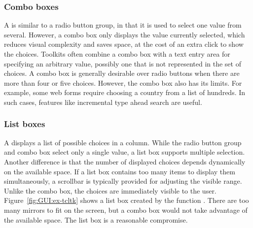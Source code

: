 \subsubsection{Combo boxes}
\label{sec:GUI:combo-boxes}

A  is similar to a radio button group, in that it is
used to select one value from several. However, a combo box only
displays the value currently selected, which reduces visual complexity
and saves space, at the cost of an extra click to show the
choices. Toolkits often combine a combo box with a text entry area for
specifying an arbitrary value, possibly one that is not represented in
the set of choices. A combo box is generally desirable over radio
buttons when there are more than four or five choices. However, the
combo box also has its limits. For example, some web forms require
choosing a country from a list of hundreds. In such cases, features
like incremental type ahead search are useful.

\subsubsection{List boxes}

A  displays a list of possible choices in a column.
While the radio button group and combo box select only a single value,
a list box supports multiple selection. Another difference is that the
number of displayed choices depends dynamically on the available
space. If a list box contains too many items to display them
simultaneously, a scrollbar is typically provided for adjusting the
visible range. Unlike the combo box, the choices are immediately visible
to the user.  Figure~\ref{fig:GUI:ex-tcltk} shows a list
box created by the \R\/ function
. There are too many mirrors to fit on the
screen, but a combo box would not take advantage of the available
space. The list box is a reasonable compromise.

